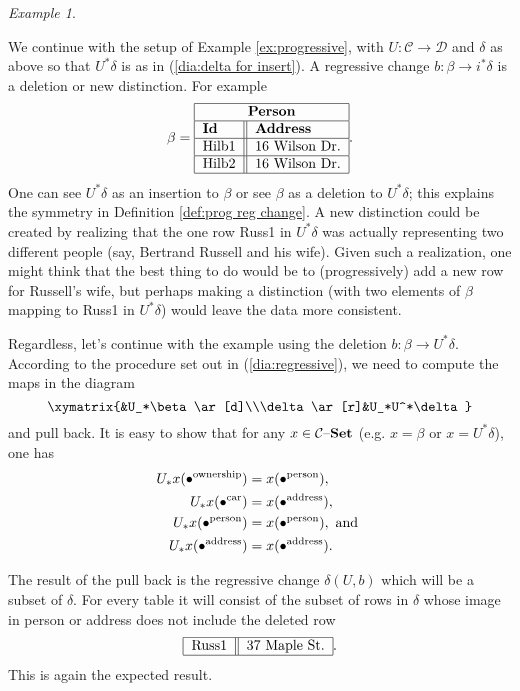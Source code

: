 \documentclass{amsart}
\def\tn{\textnormal}
\def\mc{\mathcal}
\def\to{\rightarrow}
\def\taking{\colon}
\def\set{{\text \textendash}{\bf Set}}
\def\mcC{\mc{C}}
\def\mcD{\mc{D}}
\theoremstyle{remark}
\newtheorem{example}[theorem]{Example}
\theoremstyle{definition}
\begin{document}
\begin{example}\label{ex:regressive}

We continue with the setup of Example \ref{ex:progressive}, with $U\taking\mcC\to\mcD$ and $\delta$ as above so that $U^*\delta$ is as in (\ref{dia:delta for insert}).  A regressive change $b\taking\beta\to i^*\delta$ is a deletion or new distinction.  For example \begin{align}\label{dia:delete}\beta=\begin{tabular}{| l || l |}\hline\multicolumn{2}{| c |}{\bf Person}\\\hline{\bf Id}&{\bf Address}\\\hline Hilb1&16 Wilson Dr.\\\hline Hilb2&16 Wilson Dr.\\\hline\end{tabular}.\end{align}  One can see $U^*\delta$ as an insertion to $\beta$ or see $\beta$ as a deletion to $U^*\delta$; this explains the symmetry in Definition \ref{def:prog reg change}.  A new distinction could be created by realizing that the one row Russ1 in $U^*\delta$ was actually representing two different people (say, Bertrand Russell and his wife).  Given such a realization, one might think that the best thing to do would be to (progressively) add a new row for Russell's wife, but perhaps making a distinction (with two elements of $\beta$ mapping to Russ1 in $U^*\delta$) would leave the data more consistent.

Regardless, let's continue with the example using the deletion $b\taking\beta\to U^*\delta$.  According to the procedure set out in (\ref{dia:regressive}), we need to compute the maps in the diagram $$\xymatrix{&U_*\beta\ar[d]\\\delta\ar[r]&U_*U^*\delta}$$ and pull back.  It is easy to show that for any $x\in\mcC\set$ (e.g. $x=\beta$ or $x=U^*\delta$), one has \begin{align*}U_*x(\bullet^{\tn{ownership}})&=x(\bullet^{\tn{person}}),\\U_*x(\bullet^{\tn{car}})&=x(\bullet^{\tn{address}}),\\U_*x(\bullet^{\tn{person}})&=x(\bullet^{\tn{person}}), \tn{ and }\\ U_*x(\bullet^{\tn{address}})&=x(\bullet^{\tn{address}}).\end{align*}  

The result of the pull back is the regressive change $\delta(U,b)$ which will be a subset of $\delta$.  For every table it will consist of  the subset of rows in $\delta$ whose image in person or address does not include the deleted row \begin{align}\begin{tabular}{| l || l |}\hline Russ1&37 Maple St.\\\hline\end{tabular}.\end{align}  This is again the expected result.

\end{example}
\end{document}
